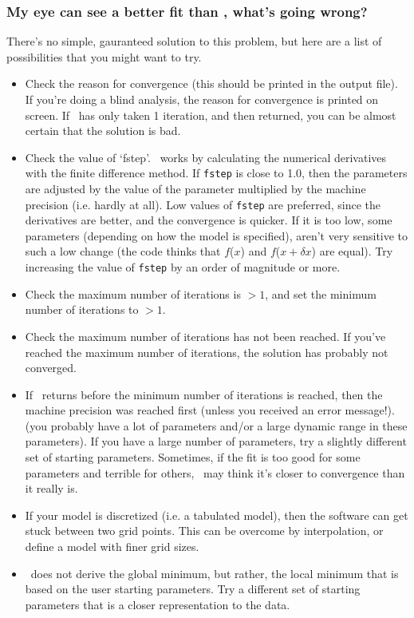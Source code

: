 \subsubsection{My eye can see a better fit than \alis, what's going wrong?}
There's no simple, gauranteed solution to this problem, but here are a list of
possibilities that you might want to try.

\begin{itemize}

\item Check the reason for convergence (this should be printed in the output file).
If you're doing a blind analysis, the reason for convergence is printed on screen.
If \alis\ has only taken 1 iteration, and then returned, you can be almost certain
that the solution is bad.

\item Check the value of `fstep'. \alis\ works by calculating the
numerical derivatives with the finite difference method. If \texttt{fstep}
is close to 1.0, then the parameters are adjusted by the value of the
parameter multiplied by the machine precision (i.e. hardly at all).
Low values of \texttt{fstep} are preferred, since the derivatives are
better, and the convergence is quicker. If it is too low, some
parameters (depending on how the model is specified), aren't very
sensitive to such a low change (the code thinks that $f$($x$) and
$f$($x+\delta x$) are equal). Try increasing the value of \texttt{fstep}
by an order of magnitude or more.

\item Check the maximum number of iterations is $>1$, and
set the minimum number of iterations to $>1$.

\item Check the maximum number of iterations has not been reached.
If you've reached the maximum number of iterations, the solution has
probably not converged.

\item If \alis\ returns before the minimum number of iterations is reached, then
the machine precision was reached first (unless you received an error message!).
(you probably have a lot of parameters and/or a large dynamic range in these parameters). 
If you have a large number of parameters, try a slightly different set of starting
parameters. Sometimes, if the fit is too good for some parameters and terrible
for others, \alis\ may think it's closer to convergence than it really is.

\item If your model is discretized (i.e. a tabulated model), then the software
can get stuck between two grid points. This can be overcome by interpolation,
or define a model with finer grid sizes.

\item \alis\ does not derive the global minimum, but rather, the local minimum
that is based on the user starting parameters. Try a different set of starting
parameters that is a closer representation to the data.

\end{itemize}

